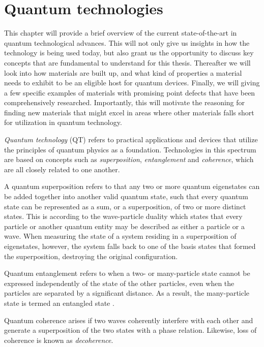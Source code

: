 \chapter{Quantum technologies}

This chapter will provide a brief overview of the current state-of-the-art in quantum technological advances. This will not only give us insights in how the technology is being used today, but also grant us the opportunity to discuss key concepts that are fundamental to understand for this thesis. Thereafter we will look into how materials are built up, and what kind of properties a material needs to exhibit to be an eligible host for quantum devices. Finally, we will giving a few specific examples of materials with promising point defects that have been comprehensively researched. Importantly, this will motivate the reasoning for finding new materials that might excel in areas where other materials falls short for utilization in quantum technology.

\textit{Quantum technology} (QT) refers to practical applications and devices that utilize the principles of quantum physics as a foundation. Technologies in this spectrum are based on concepts such as \textit{superposition}, \textit{entanglement} and \textit{coherence}, which are all closely related to one another.

A quantum superposition refers to that any two or more quantum eigenstates can be added together into another valid quantum state, such that every quantum state can be represented as a sum, or a superposition, of two or more distinct states. This is according to the wave-particle duality which states that every particle or another quantum entity may be described as either a particle or a wave. When measuring the state of a system residing in a superposition of eigenstates, however, the system falls back to one of the basis states that formed the superposition, destroying the original configuration.

Quantum entanglement refers to when a two- or many-particle state cannot be expressed independently of the state of the other particles, even when the particles are separated by a significant distance. As a result, the many-particle state is termed an entangled state \cite{Griffiths2017}.

Quantum coherence arises if two waves coherently interfere with each other and generate a superposition of the two states with a phase relation. Likewise, loss of coherence is known as \textit{decoherence}.

